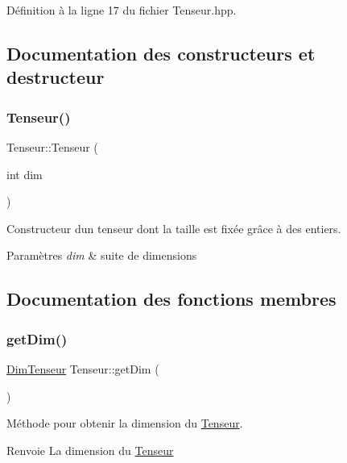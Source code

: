 Définition à la ligne 17 du fichier Tenseur.\+hpp.



\subsection{Documentation des constructeurs et destructeur}
\mbox{\label{class_tenseur_a936de784ba6d02e78456091b857c90d2}} 
\subsubsection{\texorpdfstring{Tenseur()}{Tenseur()}}
{\footnotesize\ttfamily Tenseur\+::\+Tenseur (\begin{DoxyParamCaption}\item[{int}]{dim }\end{DoxyParamCaption})}



Constructeur d\textquotesingle{}un tenseur dont la taille est fixée grâce à des entiers. 


\begin{DoxyParams}{Paramètres}
{\em dim} & suite de dimensions \\
\hline
\end{DoxyParams}


\subsection{Documentation des fonctions membres}
\mbox{\label{class_tenseur_a84d2bb71deb6f4998327f6c9309c1ed4}} 
\subsubsection{\texorpdfstring{get\+Dim()}{getDim()}}
{\footnotesize\ttfamily \hyperlink{class_dim_tenseur}{Dim\+Tenseur} Tenseur\+::get\+Dim (\begin{DoxyParamCaption}{ }\end{DoxyParamCaption})}



Méthode pour obtenir la dimension du \hyperlink{class_tenseur}{Tenseur}. 

\begin{DoxyReturn}{Renvoie}
La dimension du \hyperlink{class_tenseur}{Tenseur} 
\end{DoxyReturn}


